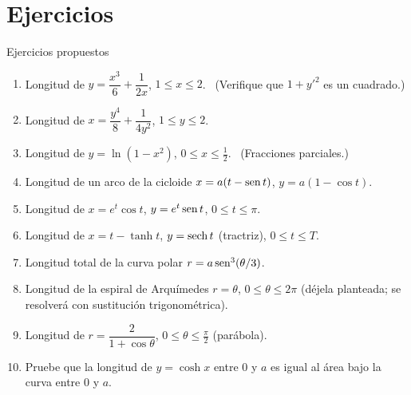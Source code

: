 \documentclass[10pt,aspectratio=169]{beamer}
\begin{document}
\section{Ejercicios}

\begin{frame}{Ejercicios propuestos}
  \begin{ejercicio}
    \begin{enumerate}
      \item Longitud de $y=\dfrac{x^3}{6}+\dfrac{1}{2x}$, $1\le x\le2$. \ \small(Verifique que $1+y'^2$ es un cuadrado.)
      \item Longitud de $x=\dfrac{y^4}{8}+\dfrac{1}{4y^2}$, $1\le y\le2$.
      \item Longitud de $y=\ln(1-x^2)$, $0\le x\le\frac12$. \ \small(Fracciones parciales.)
      \item Longitud de un arco de la cicloide $x=a(t-\operatorname{sen} t)$, $y=a(1-\cos t)$.
      \item Longitud de $x=e^t\cos t$, $y=e^t\operatorname{sen} t$, $0\le t\le\pi$.
      \item Longitud de $x=t-\tanh t$, $y=\operatorname{sech} t$ (tractriz), $0\le t\le T$.
      \item Longitud total de la curva polar $r=a\operatorname{sen}^3(\theta/3)$.
      \item Longitud de la espiral de Arquímedes $r=\theta$, $0\le\theta\le2\pi$ (déjela planteada; se resolverá con sustitución trigonométrica).
      \item Longitud de $r=\dfrac{2}{1+\cos\theta}$, $0\le\theta\le\frac\pi2$ (parábola).
      \item Pruebe que la longitud de $y=\cosh x$ entre $0$ y $a$ es igual al área bajo la curva entre $0$ y $a$.
    \end{enumerate}
  \end{ejercicio}
\end{frame}
\end{document}
